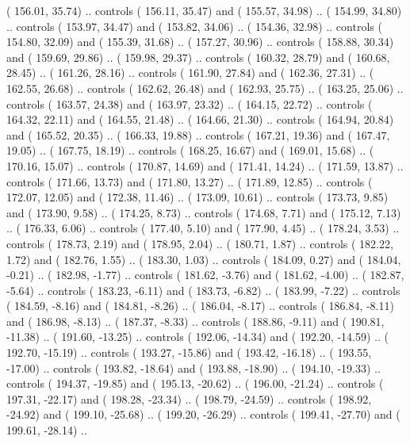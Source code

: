 {        ( 156.01,  35.74) .. controls ( 156.11,  35.47) and ( 155.57,  34.98) ..
        ( 154.99,  34.80) .. controls ( 153.97,  34.47) and ( 153.82,  34.06) ..
        ( 154.36,  32.98) .. controls ( 154.80,  32.09) and ( 155.39,  31.68) ..
        ( 157.27,  30.96) .. controls ( 158.88,  30.34) and ( 159.69,  29.86) ..
        ( 159.98,  29.37) .. controls ( 160.32,  28.79) and ( 160.68,  28.45) ..
        ( 161.26,  28.16) .. controls ( 161.90,  27.84) and ( 162.36,  27.31) ..
        ( 162.55,  26.68) .. controls ( 162.62,  26.48) and ( 162.93,  25.75) ..
        ( 163.25,  25.06) .. controls ( 163.57,  24.38) and ( 163.97,  23.32) ..
        ( 164.15,  22.72) .. controls ( 164.32,  22.11) and ( 164.55,  21.48) ..
        ( 164.66,  21.30) .. controls ( 164.94,  20.84) and ( 165.52,  20.35) ..
        ( 166.33,  19.88) .. controls ( 167.21,  19.36) and ( 167.47,  19.05) ..
        ( 167.75,  18.19) .. controls ( 168.25,  16.67) and ( 169.01,  15.68) ..
        ( 170.16,  15.07) .. controls ( 170.87,  14.69) and ( 171.41,  14.24) ..
        ( 171.59,  13.87) .. controls ( 171.66,  13.73) and ( 171.80,  13.27) ..
        ( 171.89,  12.85) .. controls ( 172.07,  12.05) and ( 172.38,  11.46) ..
        ( 173.09,  10.61) .. controls ( 173.73,   9.85) and ( 173.90,   9.58) ..
        ( 174.25,   8.73) .. controls ( 174.68,   7.71) and ( 175.12,   7.13) ..
        ( 176.33,   6.06) .. controls ( 177.40,   5.10) and ( 177.90,   4.45) ..
        ( 178.24,   3.53) .. controls ( 178.73,   2.19) and ( 178.95,   2.04) ..
        ( 180.71,   1.87) .. controls ( 182.22,   1.72) and ( 182.76,   1.55) ..
        ( 183.30,   1.03) .. controls ( 184.09,   0.27) and ( 184.04,  -0.21) ..
        ( 182.98,  -1.77) .. controls ( 181.62,  -3.76) and ( 181.62,  -4.00) ..
        ( 182.87,  -5.64) .. controls ( 183.23,  -6.11) and ( 183.73,  -6.82) ..
        ( 183.99,  -7.22) .. controls ( 184.59,  -8.16) and ( 184.81,  -8.26) ..
        ( 186.04,  -8.17) .. controls ( 186.84,  -8.11) and ( 186.98,  -8.13) ..
        ( 187.37,  -8.33) .. controls ( 188.86,  -9.11) and ( 190.81, -11.38) ..
        ( 191.60, -13.25) .. controls ( 192.06, -14.34) and ( 192.20, -14.59) ..
        ( 192.70, -15.19) .. controls ( 193.27, -15.86) and ( 193.42, -16.18) ..
        ( 193.55, -17.00) .. controls ( 193.82, -18.64) and ( 193.88, -18.90) ..
        ( 194.10, -19.33) .. controls ( 194.37, -19.85) and ( 195.13, -20.62) ..
        ( 196.00, -21.24) .. controls ( 197.31, -22.17) and ( 198.28, -23.34) ..
        ( 198.79, -24.59) .. controls ( 198.92, -24.92) and ( 199.10, -25.68) ..
        ( 199.20, -26.29) .. controls ( 199.41, -27.70) and ( 199.61, -28.14) ..
}
